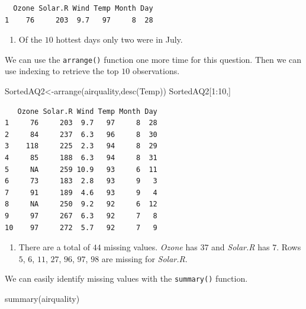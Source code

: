 \documentclass[
  letterpaper,
  DIV=11,
  numbers=noendperiod]{scrreprt}
\newenvironment{Shaded}{\begin{snugshade}}{\end{snugshade}}
\newcommand{\DecValTok}[1]{\textcolor[rgb]{0.68,0.00,0.00}{#1}}
\newcommand{\FunctionTok}[1]{\textcolor[rgb]{0.28,0.35,0.67}{#1}}
\newcommand{\NormalTok}[1]{\textcolor[rgb]{0.00,0.23,0.31}{#1}}
\newcommand{\OtherTok}[1]{\textcolor[rgb]{0.00,0.23,0.31}{#1}}
\newcommand{\SpecialCharTok}[1]{\textcolor[rgb]{0.37,0.37,0.37}{#1}}
\providecommand{\tightlist}{%
  \setlength{\itemsep}{0pt}\setlength{\parskip}{0pt}}\usepackage{longtable,booktabs,array}
\begin{document}
\begin{verbatim}
  Ozone Solar.R Wind Temp Month Day
1    76     203  9.7   97     8  28
\end{verbatim}

\begin{enumerate}
\def\labelenumi{\arabic{enumi}.}
\setcounter{enumi}{1}
\tightlist
\item
  Of the \(10\) hottest days only two were in July.
\end{enumerate}

We can use the \texttt{arrange()} function one more time for this
question. Then we can use indexing to retrieve the top \(10\)
observations.

\begin{Shaded}
\begin{Highlighting}[numbers=left,,]
\NormalTok{SortedAQ2}\OtherTok{\textless{}{-}}\FunctionTok{arrange}\NormalTok{(airquality,}\FunctionTok{desc}\NormalTok{(Temp))}
\NormalTok{SortedAQ2[}\DecValTok{1}\SpecialCharTok{:}\DecValTok{10}\NormalTok{,]}
\end{Highlighting}
\end{Shaded}

\begin{verbatim}
   Ozone Solar.R Wind Temp Month Day
1     76     203  9.7   97     8  28
2     84     237  6.3   96     8  30
3    118     225  2.3   94     8  29
4     85     188  6.3   94     8  31
5     NA     259 10.9   93     6  11
6     73     183  2.8   93     9   3
7     91     189  4.6   93     9   4
8     NA     250  9.2   92     6  12
9     97     267  6.3   92     7   8
10    97     272  5.7   92     7   9
\end{verbatim}

\begin{enumerate}
\def\labelenumi{\arabic{enumi}.}
\setcounter{enumi}{2}
\tightlist
\item
  There are a total of \(44\) missing values. \emph{Ozone} has \(37\)
  and \emph{Solar.R} has \(7\). Rows \(5\), \(6\), \(11\), \(27\),
  \(96\), \(97\), \(98\) are missing for \emph{Solar.R}.
\end{enumerate}

We can easily identify missing values with the \texttt{summary()}
function.

\begin{Shaded}
\begin{Highlighting}[numbers=left,,]
\FunctionTok{summary}\NormalTok{(airquality)}
\end{Highlighting}
\end{Shaded}
\end{document}
